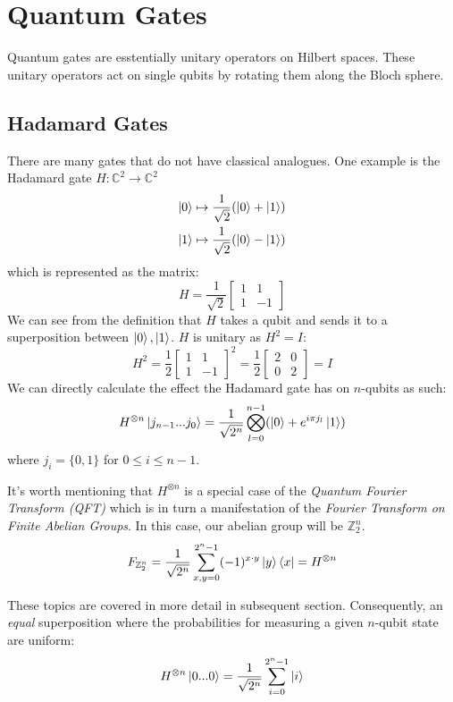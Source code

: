 \documentclass[quantum.tex]{subfiles}
\begin{document}
\section{Quantum Gates}

Quantum gates are esstentially unitary operators on Hilbert spaces. These unitary operators act on single qubits by rotating them along the Bloch sphere.

\subsection{Hadamard Gates}
There are many gates that do not have classical analogues. One example is the Hadamard gate $H: \mathbb{C}^2 \rightarrow \mathbb{C}^2$
\begin{gather*}
  \ket{0} \mapsto \frac{1}{\sqrt{2}}(\ket{0} + \ket{1}) \\
  \ket{1} \mapsto \frac{1}{\sqrt{2}}(\ket{0} - \ket{1})
\end{gather*}
which is represented as the matrix:
$$ H =  \frac{1}{\sqrt{2}} \begin{bmatrix} 1 & 1 \\ 1 & -1 \end{bmatrix} $$
We can see from the definition that $H$ takes a qubit and sends it to a superposition between $\ket{0},\ket{1}$. $H$ is unitary as $H^2 = I$:
$$H^2 = \frac{1}{2} \begin{bmatrix} 1 & 1 \\ 1 & -1 \end{bmatrix}^2 = \frac{1}{2}\begin{bmatrix} 2 & 0 \\ 0 & 2 \end{bmatrix} = I $$
%
We can directly calculate the effect the Hadamard gate has on $n$-qubits as such:
%
$$ H^{\otimes n} \ket{j_{n-1}...j_0} = \frac{1}{\sqrt{2^n}}\bigotimes_{l=0}^{n-1} (\ket{0} + e^{i\pi j_l}\ket{1}) $$
%
where $j_i = \{0,1\}$ for $0 \leq i \leq n-1$.

It's worth mentioning that $H^{\otimes n}$ is a special case of the \textit{Quantum Fourier Transform (QFT)} which is in turn a manifestation of the \textit{Fourier Transform on Finite Abelian Groups}. In this case, our abelian group will be $\mathbb{Z}_2^n$.
%
\begin{equation}
  F_{\mathbb{Z}_2^n} = \frac{1}{\sqrt{2^n}} \sum_{x,y=0}^{2^n-1} (-1)^{x \cdot y} \ket{y}\bra{x} = H^{\otimes n}
\end{equation}

These topics are covered in more detail in subsequent section.
%
Consequently, an \textit{equal} superposition where the probabilities for measuring a given $n$-qubit state are uniform:
$$H^{\otimes n}\ket{0...0} = \frac{1}{\sqrt{2^n}}\sum_{i=0}^{2^n-1}\ket{i}$$
\end{document}

